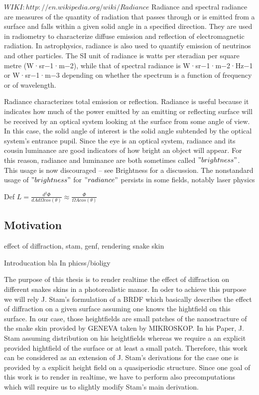 $WIKI: http://en.wikipedia.org/wiki/Radiance$
Radiance and spectral radiance are measures of the quantity of radiation that passes through or is emitted from a surface and falls within a given solid angle in a specified direction. They are used in radiometry to characterize diffuse emission and reflection of electromagnetic radiation. In astrophysics, radiance is also used to quantify emission of neutrinos and other particles. The SI unit of radiance is watts per steradian per square metre (W·sr−1·m−2), while that of spectral radiance is W·sr−1·m−2·Hz−1 or W·sr−1·m−3 depending on whether the spectrum is a function of frequency or of wavelength.

Radiance characterizes total emission or reflection. Radiance is useful because it indicates how much of the power emitted by an emitting or reflecting surface will be received by an optical system looking at the surface from some angle of view. In this case, the solid angle of interest is the solid angle subtended by the optical system's entrance pupil. Since the eye is an optical system, radiance and its cousin luminance are good indicators of how bright an object will appear. For this reason, radiance and luminance are both sometimes called $"brightness"$. This usage is now discouraged – see Brightness for a discussion. The nonstandard usage of $"brightness"$ for $"radiance"$ persists in some fields, notably laser physics

Def $L = \frac{d^2 \Phi}{dA d\Omega cos(\theta)} \approx \frac{\Phi}{\Omega A cos(\theta)}$


\subsection{Motivation}
effect of diffraction, stam, genf, rendering snake skin 

Introducation
bla 
In phicss/bioligy

The purpose of this thesis is to render realtime the effect of diffraction on different snakes skins in a photorealistic manor. In oder to achieve this purpose we will rely J. Stam's formulation of a BRDF which basically describes the effect of diffraction on a given surface assuming one knows the hightfield on this surface.
In our case, those heightfields are small patches of the nanostracture of the snake skin provided by GENEVA taken by MIKROSKOP.
In his Paper, J. Stam assuming distribution on his heightfields whereas we require a an explicit provided hightfield of the surface or at least a small patch. Therefore, this work can be considered as an extension of J. Stam's derivations for the case one is provided by a explicit height field on a quasiperiodic structure.
Since one goal of this work is to render in realtime, we have to perform also precomputations which will require us to slightly modify Stam's main derivation.


